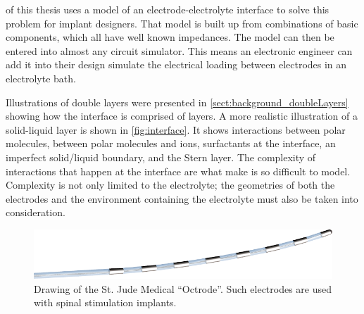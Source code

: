    of this thesis uses a model of an electrode-electrolyte interface to solve this problem for implant designers.
  That model is built up from combinations of basic components, which all have well known impedances.
  The model can then be entered into almost any circuit simulator.
  This means an electronic engineer can add it into their design simulate the electrical loading between electrodes in an electrolyte bath.

  Illustrations of double layers were presented in \cref{sect:background_doubleLayers} showing how the interface is comprised of layers.
  A more realistic illustration of a solid-liquid layer is shown in \cref{fig:interface}.
  It shows interactions between polar molecules, between polar molecules and ions, surfactants at the interface, an imperfect solid/liquid boundary, and the Stern layer.
  The complexity of interactions that happen at the interface are what make is so difficult to model.
  Complexity is not only limited to the electrolyte; the geometries of both the electrodes and the environment containing the electrolyte must also be taken into consideration.

  \begin{figure}
    \begin{center}
      \includegraphics{content/introduction/graphics/StJudeOctrode}
    \end{center}
    \caption{Drawing of the St. Jude Medical ``Octrode''. Such electrodes are used with spinal stimulation implants.}
    \label{fig:octrode}
  \end{figure}

